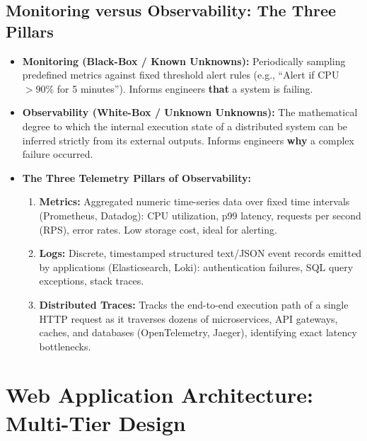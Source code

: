 \subsection{Monitoring versus Observability: The Three Pillars}
\begin{itemize}
    \item \textbf{Monitoring (Black-Box / Known Unknowns):} Periodically sampling predefined metrics against fixed threshold alert rules (e.g., ``Alert if CPU $> 90\%$ for 5 minutes''). Informs engineers \textbf{that} a system is failing.
    \item \textbf{Observability (White-Box / Unknown Unknowns):} The mathematical degree to which the internal execution state of a distributed system can be inferred strictly from its external outputs. Informs engineers \textbf{why} a complex failure occurred.
    \item \textbf{The Three Telemetry Pillars of Observability:}
    \begin{enumerate}
        \item \textbf{Metrics:} Aggregated numeric time-series data over fixed time intervals (Prometheus, Datadog): CPU utilization, p99 latency, requests per second (RPS), error rates. Low storage cost, ideal for alerting.
        \item \textbf{Logs:} Discrete, timestamped structured text/JSON event records emitted by applications (Elasticsearch, Loki): authentication failures, SQL query exceptions, stack traces.
        \item \textbf{Distributed Traces:} Tracks the end-to-end execution path of a single HTTP request as it traverses dozens of microservices, API gateways, caches, and databases (OpenTelemetry, Jaeger), identifying exact latency bottlenecks.
    \end{enumerate}
\end{itemize}



\section{Web Application Architecture: Multi-Tier Design}
\label{sec:se_web_architecture}

